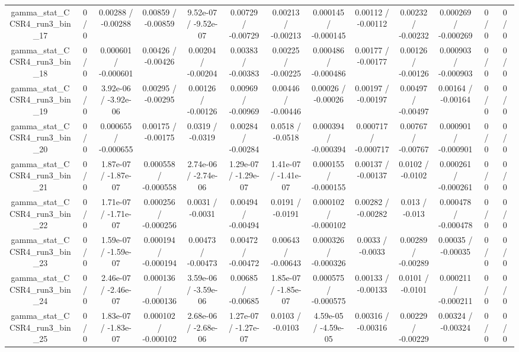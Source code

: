 \documentclass[10pt]{article}
\begin{document}
\begin{table}[htbp]
\begin{center}
\begin{tabular}{|c|c|c|c|c|c|c|c|c|c|c|c|c|}
  gamma_stat_CCSR4_run3_bin_17 & 0 / 0 & 0.00288 / -0.00288 & 0.00859 / -0.00859 & 9.52e-07 / -9.52e-07 & 0.00729 / -0.00729 & 0.00213 / -0.00213 & 0.000145 / -0.000145 & 0.00112 / -0.00112 & 0.00232 / -0.00232 & 0.000269 / -0.000269 & 0 / 0 & 0 / 0 \\ 
  gamma_stat_CCSR4_run3_bin_18 & 0 / 0 & 0.000601 / -0.000601 & 0.00426 / -0.00426 & 0.00204 / -0.00204 & 0.00383 / -0.00383 & 0.00225 / -0.00225 & 0.000486 / -0.000486 & 0.00177 / -0.00177 & 0.00126 / -0.00126 & 0.000903 / -0.000903 & 0 / 0 & 0 / 0 \\ 
  gamma_stat_CCSR4_run3_bin_19 & 0 / 0 & 3.92e-06 / -3.92e-06 & 0.00295 / -0.00295 & 0.00126 / -0.00126 & 0.00969 / -0.00969 & 0.00446 / -0.00446 & 0.00026 / -0.00026 & 0.00197 / -0.00197 & 0.00497 / -0.00497 & 0.00164 / -0.00164 & 0 / 0 & 0 / 0 \\ 
  gamma_stat_CCSR4_run3_bin_20 & 0 / 0 & 0.000655 / -0.000655 & 0.00175 / -0.00175 & 0.0319 / -0.0319 & 0.00284 / -0.00284 & 0.0518 / -0.0518 & 0.000394 / -0.000394 & 0.000717 / -0.000717 & 0.00767 / -0.00767 & 0.000901 / -0.000901 & 0 / 0 & 0 / 0 \\ 
  gamma_stat_CCSR4_run3_bin_21 & 0 / 0 & 1.87e-07 / -1.87e-07 & 0.000558 / -0.000558 & 2.74e-06 / -2.74e-06 & 1.29e-07 / -1.29e-07 & 1.41e-07 / -1.41e-07 & 0.000155 / -0.000155 & 0.00137 / -0.00137 & 0.0102 / -0.0102 & 0.000261 / -0.000261 & 0 / 0 & 0 / 0 \\ 
  gamma_stat_CCSR4_run3_bin_22 & 0 / 0 & 1.71e-07 / -1.71e-07 & 0.000256 / -0.000256 & 0.0031 / -0.0031 & 0.00494 / -0.00494 & 0.0191 / -0.0191 & 0.000102 / -0.000102 & 0.00282 / -0.00282 & 0.013 / -0.013 & 0.000478 / -0.000478 & 0 / 0 & 0 / 0 \\ 
  gamma_stat_CCSR4_run3_bin_23 & 0 / 0 & 1.59e-07 / -1.59e-07 & 0.000194 / -0.000194 & 0.00473 / -0.00473 & 0.00472 / -0.00472 & 0.00643 / -0.00643 & 0.000326 / -0.000326 & 0.0033 / -0.0033 & 0.00289 / -0.00289 & 0.00035 / -0.00035 & 0 / 0 & 0 / 0 \\ 
  gamma_stat_CCSR4_run3_bin_24 & 0 / 0 & 2.46e-07 / -2.46e-07 & 0.000136 / -0.000136 & 3.59e-06 / -3.59e-06 & 0.00685 / -0.00685 & 1.85e-07 / -1.85e-07 & 0.000575 / -0.000575 & 0.00133 / -0.00133 & 0.0101 / -0.0101 & 0.000211 / -0.000211 & 0 / 0 & 0 / 0 \\ 
  gamma_stat_CCSR4_run3_bin_25 & 0 / 0 & 1.83e-07 / -1.83e-07 & 0.000102 / -0.000102 & 2.68e-06 / -2.68e-06 & 1.27e-07 / -1.27e-07 & 0.0103 / -0.0103 & 4.59e-05 / -4.59e-05 & 0.00316 / -0.00316 & 0.00229 / -0.00229 & 0.00324 / -0.00324 & 0 / 0 & 0 / 0 \\ 

\end{tabular}
\end{center}
\end{table}
\end{document}
